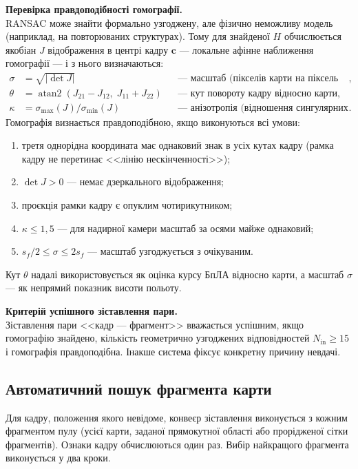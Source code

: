 \documentclass[a4paper, 12pt, titlepage]{article}
\begin{document}
\textbf{Перевірка правдоподібності гомографії.}\\
RANSAC може знайти формально узгоджену, але фізично неможливу модель (наприклад, на повторюваних структурах). Тому для знайденої $H$ обчислюється якобіан $J$ відображення в центрі кадру $\mathbf{c}$ --- локальне афінне наближення гомографії --- і з нього визначаються:
\begin{align}
\sigma &= \sqrt{|\det J|} && \text{--- масштаб (пікселів карти на піксель кадру)}, \\
\theta &= \operatorname{atan2}(J_{21} - J_{12},\; J_{11} + J_{22}) && \text{--- кут повороту кадру відносно карти}, \\
\kappa &= \sigma_{\max}(J) / \sigma_{\min}(J) && \text{--- анізотропія (відношення сингулярних чисел)}.
\end{align}
Гомографія визнається правдоподібною, якщо виконуються всі умови:
\begin{enumerate}
    \item третя однорідна координата має однаковий знак в усіх кутах кадру (рамка кадру не перетинає <<лінію нескінченності>>);
    \item $\det J > 0$ --- немає дзеркального відображення;
    \item проєкція рамки кадру є опуклим чотирикутником;
    \item $\kappa \le 1{,}5$ --- для надирної камери масштаб за осями майже однаковий;
    \item $s_f / 2 \le \sigma \le 2 s_f$ --- масштаб узгоджується з очікуваним.
\end{enumerate}
Кут $\theta$ надалі використовується як оцінка курсу БпЛА відносно карти, а масштаб $\sigma$ --- як непрямий показник висоти польоту.

\textbf{Критерій успішного зіставлення пари.}\\
Зіставлення пари <<кадр --- фрагмент>> вважається успішним, якщо гомографію знайдено, кількість геометрично узгоджених відповідностей $N_{\text{in}} \ge 15$ і гомографія правдоподібна. Інакше система фіксує конкретну причину невдачі.

\subsection{Автоматичний пошук фрагмента карти}
\label{sec:search}

Для кадру, положення якого невідоме, конвеєр зіставлення виконується з кожним фрагментом пулу (усієї карти, заданої прямокутної області або прорідженої сітки фрагментів). Ознаки кадру обчислюються один раз. Вибір найкращого фрагмента виконується у два кроки.
\end{document}
